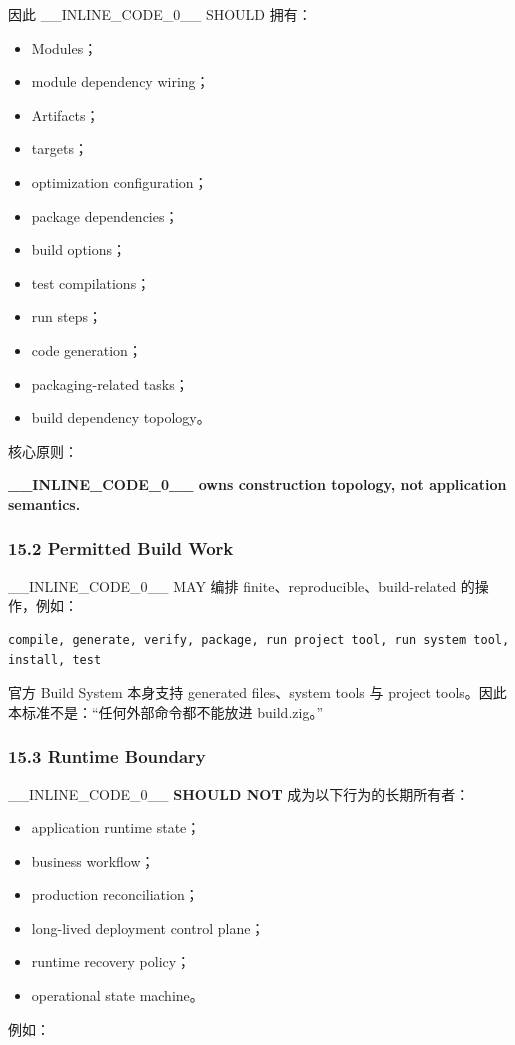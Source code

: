 \documentclass[11pt,a4paper]{article}
\begin{document}
因此 \_\_INLINE\_CODE\_0\_\_ SHOULD 拥有：

\begin{itemize}
  \item Modules；
  \item module dependency wiring；
  \item Artifacts；
  \item targets；
  \item optimization configuration；
  \item package dependencies；
  \item build options；
  \item test compilations；
  \item run steps；
  \item code generation；
  \item packaging-related tasks；
  \item build dependency topology。
\end{itemize}
核心原则：

\begin{gfmBlockquote}
\textbf{\_\_INLINE\_CODE\_0\_\_ owns construction topology, not application semantics.}
\end{gfmBlockquote}
\subsubsection{15.2 Permitted Build Work}
\_\_INLINE\_CODE\_0\_\_ MAY 编排 finite、reproducible、build-related 的操作，例如：

\begin{lstlisting}[language=text]
compile, generate, verify, package, run project tool, run system tool, install, test
\end{lstlisting}
官方 Build System 本身支持 generated files、system tools 与 project tools。因此本标准不是：“任何外部命令都不能放进 build.zig。”

\subsubsection{15.3 Runtime Boundary}
\_\_INLINE\_CODE\_0\_\_ \textbf{SHOULD NOT} 成为以下行为的长期所有者：

\begin{itemize}
  \item application runtime state；
  \item business workflow；
  \item production reconciliation；
  \item long-lived deployment control plane；
  \item runtime recovery policy；
  \item operational state machine。
\end{itemize}
例如：
\end{document}
